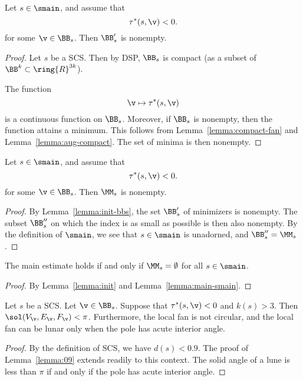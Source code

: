 \begin{lemma}\label{lemma:init-bbs} 
Let $s\in \smain$, and assume that 
\[
\tau^*(s,\v)< 0.
\]
for some $\v\in \BB_s$.
Then $\BB'_s$ is nonempty.
\end{lemma}

\begin{proof} Let $s$ be a SCS. Then by DSP,
$\BB_s$ is compact (as a subset of
$\BB^k \subset \ring{R}^{3k}$). 

 The function 
\[
\v\mapsto \tau^*(s,\v)
\]
is a continuous function on $\BB_s$.  Moreover, if $\BB_s$ is
nonempty, then the function attains a minimum.  This follows from Lemma~\ref{lemma:compact-fan} and
Lemma~\ref{lemma:aug-compact}.  The set of minima is then nonempty.
\end{proof}

\begin{lemma}\label{lemma:init}
Let $s\in \smain$, and assume that 
\[
\tau^*(s,\v)< 0.
\]
for some $\v\in \BB_s$.
Then $\MM_s$ is nonempty.
\end{lemma}

\begin{proof}    By Lemma~\ref{lemma:init-bbs}, the set 
$\BB'_s$ of minimizers is nonempty.   
The subset $\BB''_s$ on which the index is as small as possible
is then also nonempty.  By the definition of $\smain$,  we see that $s\in \smain$ is unadorned, and
  $\BB''_s = \MM_s$.
\end{proof}


\begin{lemma}  
The main estimate holds if and only if $\MM_s=\emptyset$ for all $s\in\smain$.
\end{lemma}

\begin{proof} By Lemma~\ref{lemma:init} and Lemma~\ref{lemma:main-smain}.
\end{proof}

\begin{lemma}\label{lemma:not-circular}
Let $s$ be a SCS.  Let $\v\in \BB_s$.
Suppose that $\tau^*(s,\v)< 0$ and $k(s)>3$.  Then
$\sol(V_\v,E_\v,F_\v) < \pi$.
Furthermore, the local fan is not circular, and
the local fan can be lunar only when the pole has acute interior
angle.
\end{lemma}

\begin{proof} By the definition of SCS,
we have $d(s)< 0.9$. The proof of Lemma~\ref{lemma:09} extends readily
to this context. The solid angle of a lune is less than $\pi$ if and only
if the pole has acute interior angle.
\end{proof}

